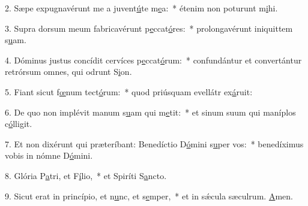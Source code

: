 2. Sæpe expugnavérunt me a juvent\uline{ú}te m\uline{e}a:~* étenim non poturunt m\uline{i}hi.\par 
3. Supra dorsum meum fabricavérunt p\uline{e}ccat\uline{ó}res:~* prolongavérunt iniquittem s\uline{u}am.\par 
4. Dóminus justus concídit cervíces p\uline{e}ccat\uline{ó}rum:~* confundántur et convertántur retrórsum omnes, qui odrunt S\uline{i}on.\par 
5. Fiant sicut f\uline{œ}num tect\uline{ó}rum:~* quod priúsquam evellátr ex\uline{á}ruit:\par 
6. De quo non implévit manum s\uline{u}am qui m\uline{e}tit:~* et sinum suum qui maníplos c\uline{ó}lligit.\par 
7. Et non dixérunt qui præteríbant: Benedíctio D\uline{ó}mini s\uline{u}per vos:~* benedíximus vobis in nómne D\uline{ó}mini.\par 
8. Glória P\uline{a}tri, et F\uline{í}lio,~* et Spiríti S\uline{a}ncto.\par 
9. Sicut erat in princípio, et n\uline{u}nc, et s\uline{e}mper,~* et in sǽcula sæculrum. \uline{A}men.\par 

